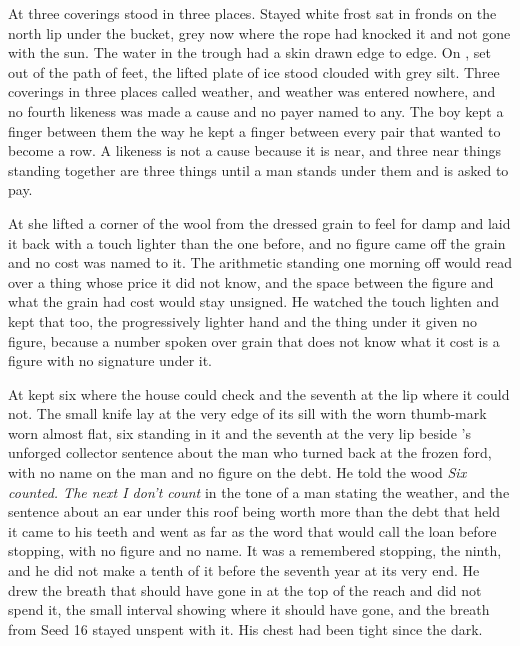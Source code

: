 At  three coverings stood in three places. Stayed white frost sat in fronds on the north lip under the bucket, grey now where the rope had knocked it and not gone with the sun. The water in the trough had a skin drawn edge to edge. On , set out of the path of feet, the lifted plate of ice stood clouded with grey silt. Three coverings in three places called weather, and weather was entered nowhere, and no fourth likeness was made a cause and no payer named to any. The boy kept a finger between them the way he kept a finger between every pair that wanted to become a row. A likeness is not a cause because it is near, and three near things standing together are three things until a man stands under them and is asked to pay.

At  she lifted a corner of the wool from the dressed grain to feel for damp and laid it back with a touch lighter than the one before, and no figure came off the grain and no cost was named to it. The arithmetic standing one morning off would read over a thing whose price it did not know, and the space between the figure and what the grain had cost would stay unsigned. He watched the touch lighten and kept that too, the progressively lighter hand and the thing under it given no figure, because a number spoken over grain that does not know what it cost is a figure with no signature under it.

\scenebreak

At   kept six where the house could check and the seventh at the lip where it could not. The small knife lay at the very edge of its sill with the worn thumb-mark worn almost flat, six standing in it and the seventh at the very lip beside 's unforged collector sentence about the man who turned back at the frozen ford, with no name on the man and no figure on the debt. He told the wood \emph{Six counted. The next I don't count} in the tone of a man stating the weather, and the sentence about an ear under this roof being worth more than the debt that held it came to his teeth and went as far as the word that would call the loan before stopping, with no figure and no name. It was a remembered stopping, the ninth, and he did not make a tenth of it before the seventh year at its very end. He drew the breath that should have gone in at the top of the reach and did not spend it, the small interval showing where it should have gone, and the breath from Seed 16 stayed unspent with it. His chest had been tight since the dark.

